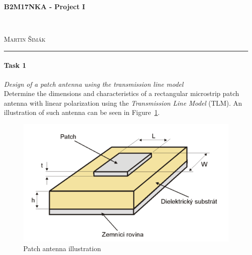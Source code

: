 \documentclass[11pt,a4paper]{article}
\begin{document}

    \begin{center}
        {\LARGE\textbf{B2M17NKA - Project I}}\\[3mm]
        \begin{minipage}{0.4\textwidth}
            \begin{flushleft}
                \textsc{}
            \end{flushleft}
        \end{minipage}
        ~
        \begin{minipage}{0.4\textwidth}
            \begin{flushright}
                \textsc{Martin Šimák}
            \end{flushright}
        \end{minipage}
        \noindent\rule{14.5cm}{0.4pt}
    \end{center}

    \paragraph{Task 1} \emph{Design of a patch antenna using the transmission line model}\\
    Determine the dimensions and characteristics of a rectangular microstrip patch antenna with linear polarization using the \emph{Transmission Line Model} (TLM). An illustration of such antenna can be seen in Figure~\ref{fig:patch-antenna-illustration}.
    \begin{figure}[!ht]
        \centering
        \includegraphics[width=.5\textwidth]{src/patch-antenna-illustration.png}
        \caption{\label{fig:patch-antenna-illustration}Patch antenna illustration}
    \end{figure}
\end{document}
